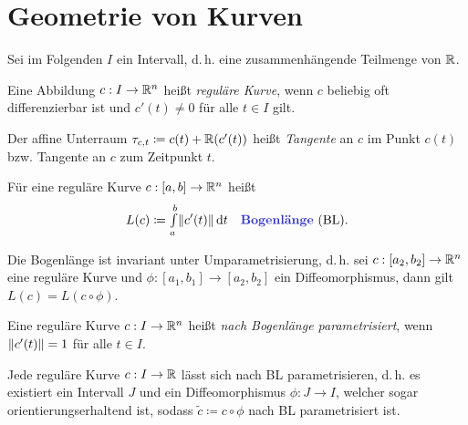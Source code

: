 \documentclass{cheat-sheet}
\newcommand{\Intabdt}[1]{\Int{a}{b}{#1}{t}}
\begin{document}

\section{Geometrie von Kurven}





\begin{nota}
  Sei im Folgenden $I$ ein Intervall, d.\,h. eine zusammenhängende Teilmenge von $\mathbb{R}$.
\end{nota}

\begin{defn}
  Eine Abbildung $c : I \to \mathbb{R}^n$ heißt \emph{reguläre Kurve}, wenn $c$ beliebig oft differenzierbar ist und $c'(t) \not= 0$ für alle $t \in I$ gilt.

  Der affine Unterraum $\tau_{c,t} \coloneqq c(t) + \mathbb{R}(c'(t))$ heißt \emph{Tangente} an $c$ im Punkt $c(t)$ bzw. Tangente an $c$ zum Zeitpunkt $t$.
\end{defn}


\begin{defn}
  Für eine reguläre Kurve $c : [a, b] \to \mathbb{R}^n$ heißt
  \[ L(c) \coloneqq \Intabdt{\norm{c'(t)}} \quad \text{\emph{Bogenlänge} (BL).} \]
\end{defn}

\begin{satz}
  Die Bogenlänge ist invariant unter Umparametrisierung, d.\,h. sei $c : [a_2, b_2] \to \mathbb{R}^n$ eine reguläre Kurve und $\phi : \left[ a_1, b_1 \right] \to \left[ a_2, b_2 \right]$ ein Diffeomorphismus, dann gilt $L(c) = L(c \circ \phi)$.
\end{satz}

\begin{defn}
  Eine reguläre Kurve $c : I \to \mathbb{R}^n$ heißt \emph{nach Bogenlänge parametrisiert}, wenn $\lVert c'(t)\rVert = 1$ für alle $t \in I$.
\end{defn}

\begin{satz}
  Jede reguläre Kurve $c : I \to \mathbb{R}$ lässt sich nach BL parametrisieren, d.\,h. es existiert ein Intervall $J$ und ein Diffeomorphismus $\phi : J \to I$, welcher sogar orientierungserhaltend ist, sodass $\tilde{c} \coloneqq c \circ \phi$ nach BL parametrisiert ist.
\end{satz}
\end{document}
